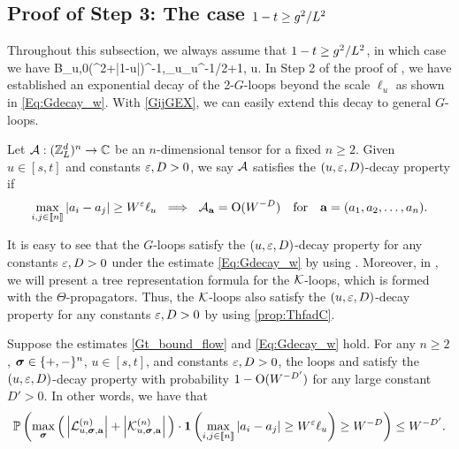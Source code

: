 \subsection{Proof of Step 3: The case \texorpdfstring{$1-t \ge \ilambda^2/L^{2}$}{1-t >= L-2}}

Throughout this subsection, we always assume that $1-t \ge \ilambda^2/L^{2}$, in which case we have 
\be\label{eq:Bu0asymp}
B_{u,0}\asymp (\ilambda^2+|1-u|)^{-1},\quad  \ell_u\asymp \ilambda\eta_u^{-1/2}+1, \quad \forall u\in [s,t].
\ee 
In Step 2 of the proof of , we have established an exponential decay of the 2-$G$-loops beyond the scale $\ell_u$ as shown in \eqref{Eq:Gdecay_w}. With \eqref{GijGEX}, we can easily extend this decay to general $G$-loops.

\begin{definition}\label{Def_decay}
Let ${\cal A}: (\Zn)^{n}\to \mathbb C$ be an $n$-dimensional tensor for a fixed $n\ge 2$. Given $u\in[s,t]$ and constants $\e,D>0$, we say $\cal A$ satisfies the $(u, \e, D)$-decay property if 
\begin{equation}\label{deccA}
    \max_{i,j\in \qqq{n}}|a_i-a_j|\ge W^{\e}\ell_u \ \implies \ {\cal A}_{\ba}=\OO(W^{-D})\quad \text{for}\quad \ba=(a_1,a_2,\ldots, a_n).
\end{equation}
\end{definition}


It is easy to see that the $G$-loops satisfy the $(u, \e, D)$-decay property for any constants $\e,D>0$ under the estimate \eqref{Eq:Gdecay_w} by using . Moreover, in , we will present a tree representation formula for the $\cK$-loops, which is formed with the $\Theta$-propagators. Thus, the $\cK$-loops also satisfy the $(u, \e, D)$-decay property for any constants $\e,D>0$ by using \eqref{prop:ThfadC}.

\begin{claim}\label{lem_decayLoop} 
Suppose the estimates \eqref{Gt_bound_flow} and \eqref{Eq:Gdecay_w} hold. For any $n\ge 2$, $\bsig\in \{+,-\}^n$, $u\in[s,t]$, and constants $\e,D>0$, the loops  and  satisfy the $(u, \e, D)$-decay property with probability $1-\OO(W^{-D'})$ for any large constant $D'>0$. In other words, we have that
\begin{align}\label{res_decayLK}
\mathbb P\left( \max_{\bsig}  \Big(\left|{\cal L}^{(n)}_{u,\bsig,\ba}\right|+\left|{\cal K}^{(n)}_{u,\bsig,\ba}\right|\Big)\cdot{\bf 1}\left(\max_{  i, j\in \qqq{n} } |a_i-a_j|\ge W^{\e}\ell_u \right) \ge W^{-D}\right)\le W^{-D'}. 
\end{align}
 \end{claim}

